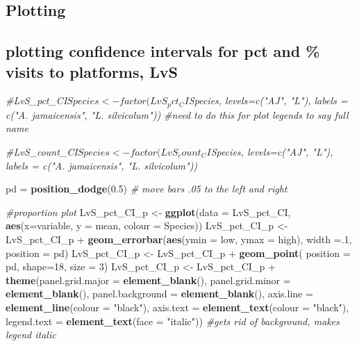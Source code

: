 \documentclass[]{article}
\newenvironment{Shaded}{\begin{snugshade}}{\end{snugshade}}
\newcommand{\KeywordTok}[1]{\textcolor[rgb]{0.13,0.29,0.53}{\textbf{{#1}}}}
\newcommand{\DataTypeTok}[1]{\textcolor[rgb]{0.13,0.29,0.53}{{#1}}}
\newcommand{\DecValTok}[1]{\textcolor[rgb]{0.00,0.00,0.81}{{#1}}}
\newcommand{\FloatTok}[1]{\textcolor[rgb]{0.00,0.00,0.81}{{#1}}}
\newcommand{\StringTok}[1]{\textcolor[rgb]{0.31,0.60,0.02}{{#1}}}
\newcommand{\CommentTok}[1]{\textcolor[rgb]{0.56,0.35,0.01}{\textit{{#1}}}}
\newcommand{\NormalTok}[1]{{#1}}
\begin{document}
\subsection{Plotting}\label{plotting}

\subsection{plotting confidence intervals for pct and \% visits to
platforms,
LvS}\label{plotting-confidence-intervals-for-pct-and-visits-to-platforms-lvs}

\begin{Shaded}
\begin{Highlighting}[]
\CommentTok{#LvS_pct_CI$Species <- factor(LvS_pct_CI$Species, levels=c("AJ", "L"), labels = c("A. jamaicensis", "L. silvicolum")) #need to do this for plot legends to say full name}

\CommentTok{#LvS_count_CI$Species <- factor(LvS_count_CI$Species, levels=c("AJ", "L"), labels = c("A. jamaicensis", "L. silvicolum"))}


\NormalTok{pd =}\StringTok{ }\KeywordTok{position_dodge}\NormalTok{(}\FloatTok{0.5}\NormalTok{) }\CommentTok{# move bars .05 to the left and right}

\CommentTok{#proportion plot}
\NormalTok{LvS_pct_CI_p <-}\StringTok{ }\KeywordTok{ggplot}\NormalTok{(}\DataTypeTok{data =} \NormalTok{LvS_pct_CI, }\KeywordTok{aes}\NormalTok{(}\DataTypeTok{x=}\NormalTok{variable, }\DataTypeTok{y =} \NormalTok{mean, }\DataTypeTok{colour =} \NormalTok{Species))}
\NormalTok{LvS_pct_CI_p <-}\StringTok{ }\NormalTok{LvS_pct_CI_p +}\StringTok{ }\KeywordTok{geom_errorbar}\NormalTok{(}\KeywordTok{aes}\NormalTok{(}\DataTypeTok{ymin =} \NormalTok{low, }\DataTypeTok{ymax =} \NormalTok{high), }\DataTypeTok{width =}\NormalTok{.}\DecValTok{1}\NormalTok{, }\DataTypeTok{position =} \NormalTok{pd)}
\NormalTok{LvS_pct_CI_p <-}\StringTok{ }\NormalTok{LvS_pct_CI_p +}\StringTok{ }\KeywordTok{geom_point}\NormalTok{( }\DataTypeTok{position =} \NormalTok{pd, }\DataTypeTok{shape=}\DecValTok{18}\NormalTok{, }\DataTypeTok{size =} \DecValTok{3}\NormalTok{)}
\NormalTok{LvS_pct_CI_p <-}\StringTok{ }\NormalTok{LvS_pct_CI_p +}\StringTok{ }\KeywordTok{theme}\NormalTok{(}\DataTypeTok{panel.grid.major =} \KeywordTok{element_blank}\NormalTok{(), }\DataTypeTok{panel.grid.minor =} \KeywordTok{element_blank}\NormalTok{(),}
\DataTypeTok{panel.background =} \KeywordTok{element_blank}\NormalTok{(), }\DataTypeTok{axis.line =} \KeywordTok{element_line}\NormalTok{(}\DataTypeTok{colour =} \StringTok{"black"}\NormalTok{), }\DataTypeTok{axis.text =} \KeywordTok{element_text}\NormalTok{(}\DataTypeTok{colour =} \StringTok{"black"}\NormalTok{), }\DataTypeTok{legend.text =} \KeywordTok{element_text}\NormalTok{(}\DataTypeTok{face =} \StringTok{"italic"}\NormalTok{))  }\CommentTok{#gets rid of background, makes legend italic}


\end{Highlighting}
\end{Shaded}
\end{document}
